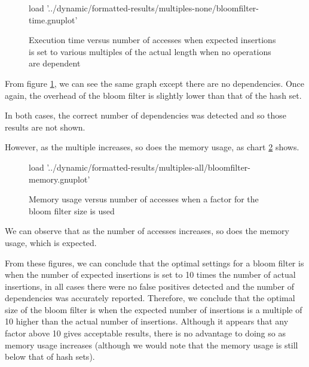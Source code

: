 \begin{figure}
	\centering
	\begin{gnuplot}[terminal=pdf]
	load '../dynamic/formatted-results/multiples-none/bloomfilter-time.gnuplot'
	\end{gnuplot}
	\caption{Execution time versus number of accesses when expected insertions is set to various multiples of the actual length when no operations are dependent}
	\label{chart:multiples-none}
\end{figure}

From figure \ref{chart:multiples-none}, we can see the same graph except there are no dependencies. Once again, the overhead of the bloom filter is slightly lower than that of the hash set.

In both cases, the correct number of dependencies was detected and so those results are not shown.

However, as the multiple increases, so does the memory usage, as chart \ref{chart:multiples-memory} shows.

\begin{figure}
	\centering
	\begin{gnuplot}[terminal=pdf]
	load '../dynamic/formatted-results/multiples-all/bloomfilter-memory.gnuplot'
	\end{gnuplot}
	\caption{Memory usage versus number of accesses when a factor for the bloom filter size is used}
	\label{chart:multiples-memory}
\end{figure}

We can observe that as the number of accesses increases, so does the memory usage, which is expected.

From these figures, we can conclude that the optimal settings for a bloom filter is when the number of expected insertions is set to 10 times the number of actual insertions, in all cases there were no false positives detected and the number of dependencies was accurately reported. Therefore, we conclude that the optimal size of the bloom filter is when the expected number of insertions is a multiple of 10 higher than the actual number of insertions. Although it appears that any factor above 10 gives acceptable results, there is no advantage to doing so as memory usage increases (although we would note that the memory usage is still below that of hash sets).

